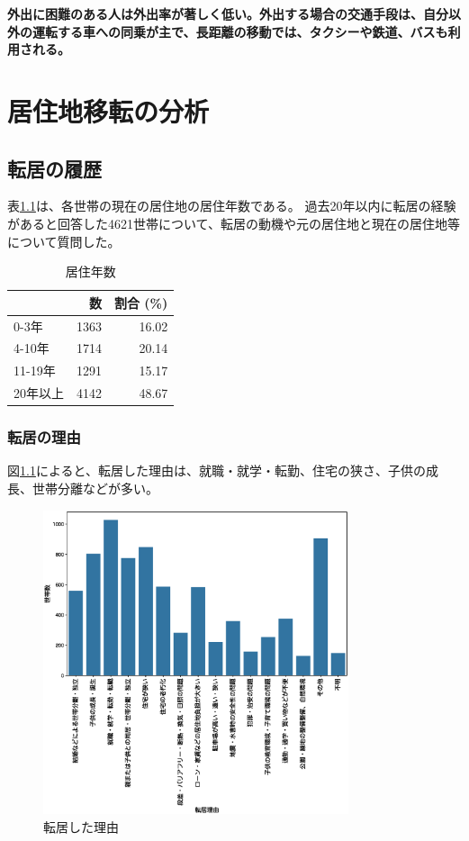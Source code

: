 \documentclass[a4paper,12pt, uplatex]{jsbook}
\begin{document}
\color{red}
\begin{framed}
\noindent
\textbf{\large 外出に困難のある人は外出率が著しく低い。外出する場合の交通手段は、自分以外の運転する車への同乗が主で、長距離の移動では、タクシーや鉄道、バスも利用される。}
\end{framed}
\color{black}




\chapter{居住地移転の分析}

\section{転居の履歴}

表\ref{tab:居住年数}は、各世帯の現在の居住地の居住年数である。
過去20年以内に転居の経験があると回答した4621世帯について、転居の動機や元の居住地と現在の居住地等について質問した。

\begin{table}[htbp]
\centering
\caption{居住年数}
\label{tab:居住年数}
\begin{tabular}{lrr}
\toprule
 & 数 & 割合 (\%) \\
\midrule
0-3年 & 1363 & 16.02 \\
4-10年 & 1714 & 20.14 \\
11-19年 & 1291 & 15.17 \\
20年以上 & 4142 & 48.67 \\
\bottomrule
\end{tabular}
\end{table}

\subsection{転居の理由}

図\ref{fig:reasons_for_moving}によると、転居した理由は、就職・就学・転勤、住宅の狭さ、子供の成長、世帯分離などが多い。
\begin{figure}[H]
    \centering
    \includegraphics[width=0.8\textwidth]{picture/転居理由.eps}
    \caption{転居した理由}
    \label{fig:reasons_for_moving}
\end{figure}
\end{document}
